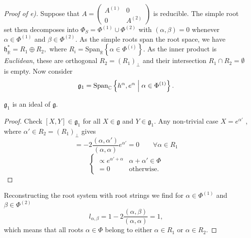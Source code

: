 \begin{proof}[Proof of e)]
  Suppose that $A = \begin{pmatrix}
      A^{(1)} & 0 \\
      0 & A^{(2)}
      \end{pmatrix} $ is reducible.
  The simple root set then decomposes into $ \Phi_S = \Phi^{(1)} \cup \Phi^{(2)}$ with $(\alpha, \beta) = 0$ whenever $\alpha \in \Phi^{(1)}$ and $\beta \in \Phi^{(2)}$.
  As the simple roots span the root space, we have $ \mathfrak{h}^*_{\mathbb{R}} = R_1 \oplus R_2, $ where $R_i = \text{Span}_{\mathbb{R}}\left\{\alpha \in \Phi^{(i)}\right\}$.
  As the inner product is \emph{Euclidean}, these are orthogonal $R_2 = (R_1)_{\perp}$ and their intersection $R_1 \cap R_2 = \emptyset$ is empty.
  Now consider 
  \begin{equation} 
    \mathfrak{g}_1 = \text{Span}_{\mathbb{C}}\left\{h^{\alpha}, e^{\alpha} \suchthat \alpha \in \Phi^{(1)}\right\}.
  \end{equation}
  \begin{claim}
    $\mathfrak{g}_1$ is an ideal of $\mathfrak{g}$.
  \end{claim}
  \begin{leftbar}
    \begin{proof}[Proof]
      Check $[X, Y] \in \mathfrak{g}_1$ for all $X \in \mathfrak{g}$ and $Y \in \mathfrak{g}_1$.
      Any non-trivial case $X = e^{\alpha'}$ , where $\alpha' \in R_2 = (R_1)_{\perp}$ gives
       \begin{equation}
	[e^{\alpha'}, h^{\alpha} ] = -2 \frac{(\alpha,\alpha')}{(\alpha, \alpha)} e^{\alpha'} = 0 \qquad \forall \alpha \in R_1
      \end{equation}
       \begin{equation}
	[e^{\alpha'}, e^{\alpha} ]
	\begin{cases}
	  \propto e^{\alpha' + \alpha} & \alpha + \alpha' \in \Phi \\
	  = 0 & \text{otherwise}.
	\end{cases}
      \end{equation}
    \end{proof}
  \end{leftbar}
  Reconstructing the root system with root strings we find for $\alpha \in \Phi^{(1)}$ and $\beta \in \Phi^{(2)}$
  \begin{equation}
    l_{\alpha, \beta} = 1 - 2 \frac{(\alpha, \beta)}{(\alpha, \alpha)} = 1,
  \end{equation}
  which means that all roots $\alpha \in \Phi$ belong to either $\alpha \in R_1$ or $\alpha \in R_2$.

\end{proof}
